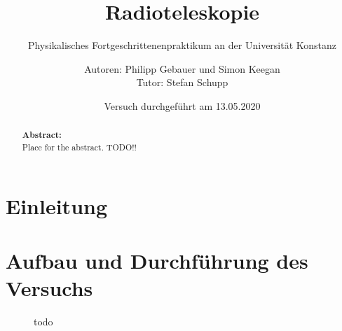 

 
 \title{Radioteleskopie}
 \subtitle{Physikalisches Fortgeschrittenenpraktikum an der Universität Konstanz}
 \author{Autoren: Philipp Gebauer und Simon Keegan \\ \large{Tutor: Stefan Schupp}}
 \date{Versuch durchgeführt am 13.05.2020}
 \maketitle
 \vspace{2.5 cm}
 \begin{abstract}
     \noindent \textbf{Abstract:}\\
     Place for the abstract. TODO!!
     \vspace{1cm}
     
     \end{abstract}
 \thispagestyle{empty}
 \newpage
 
 \tableofcontents
 \thispagestyle{empty}
 \newpage
 \setcounter{page}{1}    
 
\section{Einleitung}
\section{Aufbau und Durchführung des Versuchs}

\begin{figure}[H]
    \centering
    
    \caption{todo}
    \label{fig:Sonnenabbild}
\end{figure}
 
     
     \newpage
     
 
 \listoffigures
 
 
 